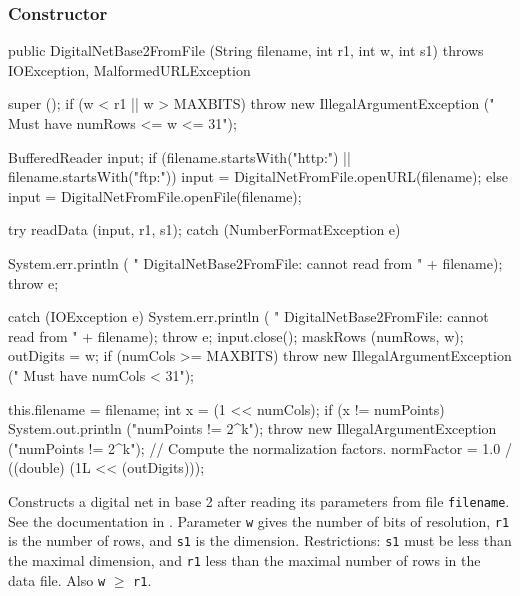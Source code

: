 \subsubsection* {Constructor}
\begin{code}

   public DigitalNetBase2FromFile (String filename, int r1, int w, int s1)
         throws IOException, MalformedURLException\begin{hide}
   {
      super ();
      if (w < r1 || w > MAXBITS)
         throw new IllegalArgumentException (" Must have numRows <= w <= 31");

      BufferedReader input;
      if (filename.startsWith("http:") || filename.startsWith("ftp:"))
         input = DigitalNetFromFile.openURL(filename);
      else
         input = DigitalNetFromFile.openFile(filename);

      try {
         readData (input, r1, s1);
      } catch (NumberFormatException e) {
         System.err.println (
            "   DigitalNetBase2FromFile:   cannot read from   " + filename);
         throw e;

      }  catch (IOException e) {
         System.err.println (
            "   DigitalNetBase2FromFile:  cannot read from  " + filename);
         throw e;
      }
      input.close();
      maskRows (numRows, w);
      outDigits = w;
      if (numCols >= MAXBITS)
         throw new IllegalArgumentException (" Must have numCols < 31");

      this.filename = filename;
      int x = (1 << numCols);
      if (x != numPoints) {
         System.out.println ("numPoints != 2^k");
         throw new IllegalArgumentException ("numPoints != 2^k");
      }
      // Compute the normalization factors.
      normFactor = 1.0 / ((double) (1L << (outDigits)));

  }\end{hide}
\end{code}
\begin{tabb}
    Constructs a digital net in base 2 after reading its parameters from file
    {\texttt{filename}}. See the documentation in
  .
   Parameter \texttt{w} gives the number of bits of resolution, \texttt{r1} is
   the number of rows, and \texttt{s1} is the dimension.
   Restrictions: \texttt{s1} must be less than the maximal dimension, and
   \texttt{r1} less than the maximal number of rows in the data file.
   Also \texttt{w} $\ge$ \texttt{r1}.
\end{tabb}
